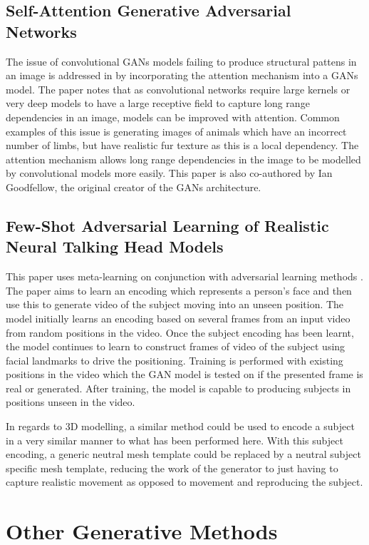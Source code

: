 \documentclass[12pt]{article}
\begin{document}
\subsection{Self-Attention Generative Adversarial Networks}
The issue of convolutional GANs models \cite{Radford2016} failing to produce structural pattens in an image is addressed in \cite{Zhang2018} by incorporating the attention mechanism into a GANs model.
The paper notes that as convolutional networks require large kernels or very deep models to have a large receptive field to capture long range dependencies in an image, models can be improved with attention.
Common examples of this issue is generating images of animals which have an incorrect number of limbs, but have realistic fur texture as this is a local dependency.
The attention mechanism allows long range dependencies in the image to be modelled by convolutional models more easily.
This paper is also co-authored by Ian Goodfellow, the original creator of the GANs architecture.

\subsection{Few-Shot Adversarial Learning of Realistic Neural Talking Head Models}
This paper uses meta-learning on conjunction with adversarial learning methods \cite{Zakharov2019}.
The paper aims to learn an encoding which represents a person's face and then use this to generate video of the subject moving into an unseen position.
The model initially learns an encoding based on several frames from an input video from random positions in the video.
Once the subject encoding has been learnt, the model continues to learn to construct frames of video of the subject using facial landmarks to drive the positioning.
Training is performed with existing positions in the video which the GAN model is tested on if the presented frame is real or generated.
After training, the model is capable to producing subjects in positions unseen in the video.

In regards to 3D modelling, a similar method could be used to encode a subject in a very similar manner to what has been performed here.
With this subject encoding, a generic neutral mesh template could be replaced by a neutral subject specific mesh template, reducing the work of the generator to just having to capture realistic movement as opposed to movement and reproducing the subject.


\section{Other Generative Methods}
\end{document}
